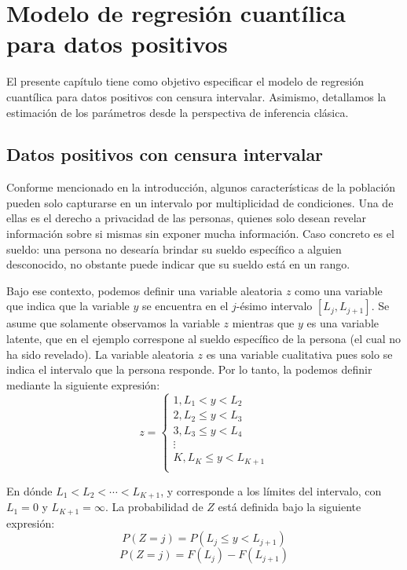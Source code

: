\chapter{Modelo de regresión cuantílica para datos positivos}
El presente capítulo tiene como objetivo especificar el modelo de regresión cuantílica para datos positivos con censura intervalar. Asimismo, detallamos la estimación de los parámetros desde la perspectiva de inferencia clásica.

\section{Datos positivos con censura intervalar}

Conforme mencionado en la introducción, algunos características de la población pueden solo capturarse en un intervalo por multiplicidad de condiciones. Una de ellas es el derecho a privacidad de las personas, quienes solo desean revelar información sobre si mismas sin exponer mucha información. Caso concreto es el sueldo: una persona no desearía brindar su sueldo específico a alguien desconocido, no obstante puede indicar que su sueldo está en un rango.

Bajo ese contexto, podemos definir una variable aleatoria $z$ como una variable que indica que la variable $y$ se encuentra en el $j$-ésimo intervalo $[L_{j},L_{j+1}]$. Se asume que solamente observamos la variable $z$ mientras que $y$ es una variable latente, que en el ejemplo correspone al sueldo específico de la persona (el cual no ha sido revelado). La variable aleatoria $z$ es una variable cualitativa pues solo se indica el intervalo que la persona responde. Por lo tanto, la podemos definir mediante la siguiente expresión:
\begin{equation}
z = 
	\begin{cases}
		1, L_{1}< y < L_{2} \\
		2, L_{2} \leq y < L_{3} \\
		3, L_{3} \leq y < L_{4} \\
		\vdots \\
		K, L_{K} \leq y < L_{K+1} \\
	\end{cases}
\end{equation}

En dónde $L_1 < L_2 < \cdots < L_{K+1}$, y corresponde a los límites del intervalo, con $L_{1}=0$ y $L_{K+1}=\infty$. La probabilidad de $Z$ está definida bajo la siguiente expresión:
\[P\left( Z=j \right)=P\left(L_{j} \leq y < L_{j+1} \right)\]
\[P\left( Z=j \right)=F\left( L_{j} \right)-F\left( L_{j+1} \right)\]

